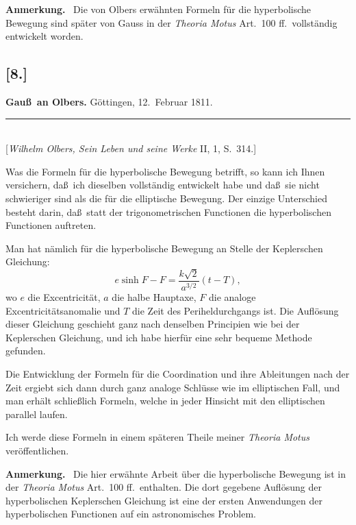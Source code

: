 \documentclass[12pt,a4paper]{article}
\theoremstyle{plain}
\theoremstyle{definition}
\theoremstyle{remark}
\begin{document}
\medskip

\textbf{Anmerkung.} \ Die von {\sc Olbers} erw\"ahnten Formeln f\"ur
die hyperbolische Bewegung sind sp\"ater von {\sc Gauss} in der
\textit{Theoria Motus} Art.~100 ff.\ vollst\"andig entwickelt
worden.


\subsection*{[8.]}
\begin{center}
\textbf{Gau\ss\ an Olbers.} G\"ottingen, 12.~Februar 1811.
\end{center}
\begin{center}
\rule{6cm}{0.4pt}\\[4pt]
[{\it Wilhelm Olbers, Sein Leben und seine Werke} II, 1, S.~314.]
\end{center}

Was die Formeln f\"ur die hyperbolische Bewegung betrifft, so
kann ich Ihnen versichern, da\ss\ ich dieselben vollst\"andig
entwickelt habe und da\ss\ sie nicht schwieriger sind als die f\"ur
die elliptische Bewegung. Der einzige Unterschied besteht darin,
da\ss\ statt der trigonometrischen Functionen die hyperbolischen
Functionen auftreten.

Man hat n\"amlich f\"ur die hyperbolische Bewegung an Stelle der
{Kepler}schen Gleichung:
\[
e\sinh F - F = \frac{k\sqrt{2}}{a^{3/2}}(t - T),
\]
wo $e$ die Excentricit\"at, $a$ die halbe Hauptaxe, $F$ die
analoge Excentricit\"atsanomalie und $T$ die Zeit des Periheldurchgangs
ist. Die Aufl\"osung dieser Gleichung geschieht ganz nach denselben
Principien wie bei der {Kepler}schen Gleichung, und ich habe
hierf\"ur eine sehr bequeme Methode gefunden.

Die Entwicklung der Formeln f\"ur die Coordination und ihre
Ableitungen nach der Zeit ergiebt sich dann durch ganz analoge
Schl\"usse wie im elliptischen Fall, und man erh\"alt schlie\ss lich
Formeln, welche in jeder Hinsicht mit den elliptischen
parallel laufen.

Ich werde diese Formeln in einem sp\"ateren Theile meiner
\textit{Theoria Motus} ver\"offentlichen.

\medskip

\textbf{Anmerkung.} \ Die hier erw\"ahnte Arbeit \"uber die
hyperbolische Bewegung ist in der \textit{Theoria Motus} Art.~100
ff.\ enthalten. Die dort gegebene Aufl\"osung der hyperbolischen
{Kepler}schen Gleichung ist eine der ersten Anwendungen der
hyperbolischen Functionen auf ein astronomisches Problem.
\end{document}
